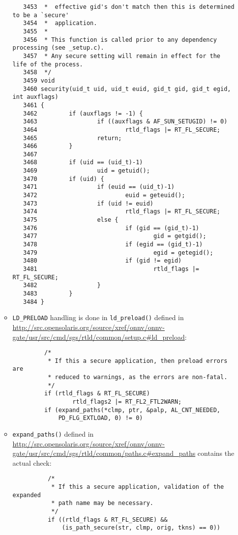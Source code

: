 \begin{itemize}
\begin{itemize}
\begin{verbatim}
   3453  *	effective gid's don't match then this is determined to be a `secure'
   3454  *	application.
   3455  *
   3456  * This function is called prior to any dependency processing (see _setup.c).
   3457  * Any secure setting will remain in effect for the life of the process.
   3458  */
   3459 void
   3460 security(uid_t uid, uid_t euid, gid_t gid, gid_t egid, int auxflags)
   3461 {
   3462         if (auxflags != -1) {
   3463                 if ((auxflags & AF_SUN_SETUGID) != 0)
   3464                         rtld_flags |= RT_FL_SECURE;
   3465                 return;
   3466         }
   3467 
   3468         if (uid == (uid_t)-1)
   3469                 uid = getuid();
   3470         if (uid) {
   3471                 if (euid == (uid_t)-1)
   3472                         euid = geteuid();
   3473                 if (uid != euid)
   3474                         rtld_flags |= RT_FL_SECURE;
   3475                 else {
   3476                         if (gid == (gid_t)-1)
   3477                                 gid = getgid();
   3478                         if (egid == (gid_t)-1)
   3479                                 egid = getegid();
   3480                         if (gid != egid)
   3481                                 rtld_flags |= RT_FL_SECURE;
   3482                 }
   3483         }
   3484 }
\end{verbatim}
  \item \texttt{LD\_PRELOAD} handling is done in \texttt{ld\_preload()}
  defined in
\url{http://src.opensolaris.org/source/xref/onnv/onnv-gate/usr/src/cmd/sgs/rtld/common/setup.c#ld\_preload}:
\begin{verbatim}
         /*
          * If this a secure application, then preload errors are
          * reduced to warnings, as the errors are non-fatal.
          */
         if (rtld_flags & RT_FL_SECURE)
                 rtld_flags2 |= RT_FL2_FTL2WARN;
         if (expand_paths(*clmp, ptr, &palp, AL_CNT_NEEDED,
             PD_FLG_EXTLOAD, 0) != 0)
\end{verbatim}
  \item \texttt{expand\_paths()} defined in
  \url{http://src.opensolaris.org/source/xref/onnv/onnv-gate/usr/src/cmd/sgs/rtld/common/paths.c#expand\_paths}
  contains the actual check:
\begin{verbatim}
          /*
           * If this a secure application, validation of the expanded
           * path name may be necessary.
           */
          if ((rtld_flags & RT_FL_SECURE) &&
              (is_path_secure(str, clmp, orig, tkns) == 0))

\end{verbatim}
\end{itemize}
\end{itemize}
